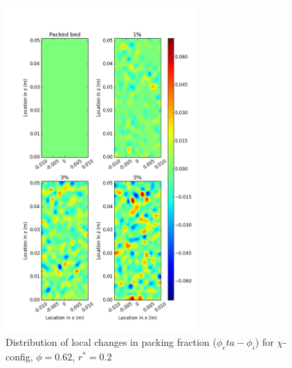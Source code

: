 \begin{figure}[!t]
    \centering
    \includegraphics[width = 0.65\textwidth]{figures/x-62-r125-1-deltas.png}
    \caption{Distribution of local changes in packing fraction ($\phi_eta - \phi_i$) for $\chi$-config, $\phi = 0.62$, $r^* = 0.2$}\label{fig:x-62-r125-deltas}
\end{figure}

